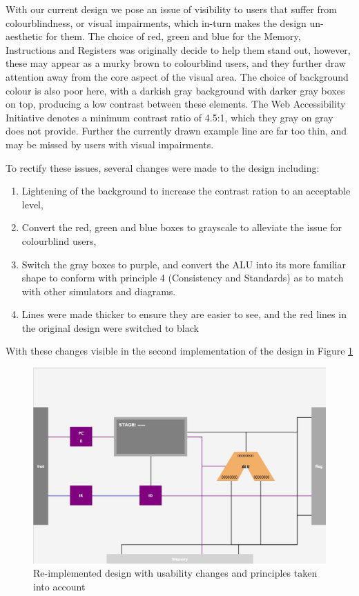 With our current design we pose an issue of visibility to users that suffer from colourblindness, or visual impairments, which in-turn makes the design un-aesthetic for them. The choice of red, green and blue for the Memory, Instructions and Registers was originally decide to help them stand out, however, these may appear as a murky brown to colourblind users, and they further draw attention away from the core aspect of the visual area. The choice of background colour is also poor here, with a darkish gray background with darker gray boxes on top, producing a low contrast between these elements. The Web Accessibility Initiative \cite{webaccessibilityinitiativew3_2022_understanding} denotes a minimum contrast ratio of 4.5:1, which they gray on gray does not provide. Further the currently drawn example line are far too thin, and may be missed by users with visual impairments.

To rectify these issues, several changes were made to the design including:
\begin{enumerate}
    \item Lightening of the background to increase the contrast ration to an acceptable level,
    \item Convert the red, green and blue boxes to grayscale to alleviate the issue for colourblind users,
    \item Switch the gray boxes to purple, and convert the ALU into its more familiar shape to conform with principle 4 (Consistency and Standards) as to match with other simulators and diagrams.
    \item Lines were made thicker to ensure they are easier to see, and the red lines in the original design were switched to black
\end{enumerate}

With these changes visible in the second implementation of the design in Figure \ref{fig:second_implemented_design}

\begin{figure}[H]
    \centering
    \includegraphics[width=0.9\linewidth]{dissertation/DATA/second_design_implementation.jpg}
    \caption{Re-implemented design with usability changes and principles taken into account}
    \label{fig:second_implemented_design}
\end{figure}

